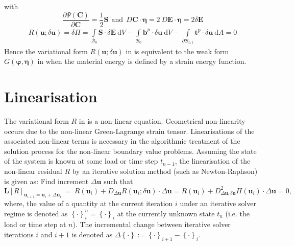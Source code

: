 with 
\begin{equation}
\dfrac{\partial \Psi (\mathbf{C})}{\partial \mathbf{C}} = \dfrac{1}{2} \mathbf{S} \ \ \text{and} \ \ D \mathbf{C} \cdot \bm{\eta} = 2 \ D \mathbf{E} \cdot \bm{\eta} = 2 \delta \mathbf{E}
\label{eq:2.12.2}
\end{equation}
\begin{align}
R(\mathbf{u}; \delta \mathbf{u}) =\delta \Pi = \int\limits_{\mathcal{B}_0} \mathbf{S} \cdot \delta \mathbf{E} \ \mathrm{d}V - \int\limits_{\mathcal{B}_0} \mathbf{b}^p \cdot \delta \mathbf{u} \ \mathrm{d}V - \int\limits_{\mathcal{\partial B}_{0,t}} \mathbf{t}^p \cdot \delta \mathbf{u} \ \mathrm{d}A = 0 
\label{eq:2.13}
\end{align}
Hence the variational form $R(\mathbf{u}; \delta \mathbf{u})$ in  is equivalent to the weak form $G(\bm{\varphi},\bm{\eta})$ in  when the material energy is defined by a strain energy function. 

\section{Linearisation}
The variational form $R$ in  is a non-linear equation. Geometrical non-linearity occurs due to the non-linear Green-Lagrange strain tensor. Linearisations of the associated non-linear terms is necessary in the algorithmic treatment of the solution process for the non-linear boundary value problems. Assuming the state of the system is known at some load or time step $t_{n-1}$, the linearisation of the non-linear residual $R$ by an iterative solution method (such as Newton-Raphson) is given as: Find increment $\Delta \mathbf{u}$ such that 
\begin{equation}
\mathbf{L}\left[ R \right]_{\mathbf{u}_{i+1} = \mathbf{u}_{i} + \Delta \mathbf{u}_i} \ = \ R(\mathbf{u}_{i}) + D_{\Delta\mathbf{u}} R(\mathbf{u}_i; \delta \mathbf{u}) \cdot \Delta\mathbf{u} = R(\mathbf{u}_{i}) + D^2_{\Delta\mathbf{u}, \delta\mathbf{u}} \Pi(\mathbf{u}_{i}) \cdot \Delta\mathbf{u} = 0,
\label{eq:2.14}
\end{equation}
where, the value of a quantity at the current iteration $i$ under an iterative solver regime is denoted as ${\left\lbrace \cdot \right\rbrace}_{i}^{n} = {\left\lbrace \cdot \right\rbrace}_{i}$ at the currently unknown state $t_n$ (i.e. the load or time step at $n$). The incremental change between iterative solver iterations $i$ and $i+1$ is denoted as $\Delta \left\lbrace \cdot \right\rbrace := {\left\lbrace \cdot \right\rbrace}_{i+1} - {\left\lbrace \cdot \right\rbrace}_{i}$. \par 

